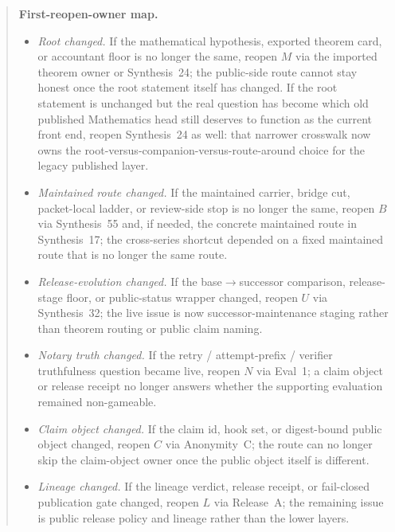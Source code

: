 \documentclass[11pt]{article}
\begin{document}
\begin{quote}\small
\textbf{First-reopen-owner map.}
\begin{itemize}[leftmargin=*]
\item \emph{Root changed.} If the mathematical hypothesis, exported theorem card, or accountant floor is no longer the same, reopen $M$ via the imported theorem owner or Synthesis~24; the public-side route cannot stay honest once the root statement itself has changed. If the root statement is unchanged but the real question has become which old published Mathematics head still deserves to function as the current front end, reopen Synthesis~24 as well: that narrower crosswalk now owns the root-versus-companion-versus-route-around choice for the legacy published layer.
\item \emph{Maintained route changed.} If the maintained carrier, bridge cut, packet-local ladder, or review-side stop is no longer the same, reopen $B$ via Synthesis~55 and, if needed, the concrete maintained route in Synthesis~17; the cross-series shortcut depended on a fixed maintained route that is no longer the same route.
\item \emph{Release-evolution changed.} If the base$\to$successor comparison, release-stage floor, or public-status wrapper changed, reopen $U$ via Synthesis~32; the live issue is now successor-maintenance staging rather than theorem routing or public claim naming.
\item \emph{Notary truth changed.} If the retry / attempt-prefix / verifier truthfulness question became live, reopen $N$ via Eval~1; a claim object or release receipt no longer answers whether the supporting evaluation remained non-gameable.
\item \emph{Claim object changed.} If the claim id, hook set, or digest-bound public object changed, reopen $C$ via Anonymity~C; the route can no longer skip the claim-object owner once the public object itself is different.
\item \emph{Lineage changed.} If the lineage verdict, release receipt, or fail-closed publication gate changed, reopen $L$ via Release~A; the remaining issue is public release policy and lineage rather than the lower layers.
\end{itemize}
\end{quote}
\end{document}
